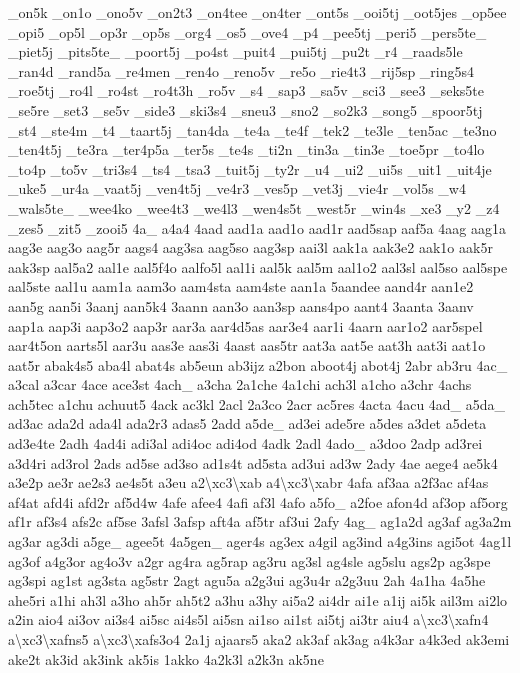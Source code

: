 {\-\_\-on5k \-\_\-on1o \-\_\-ono5v \-\_\-on2t3 \-\_\-on4tee \-\_\-on4ter \-\_\-ont5s \-\_\-ooi5tj \-\_\-oot5jes \-\_\-op5ee \-\_\-opi5 \-\_\-op5l \-\_\-op3r \-\_\-op5s \-\_\-org4 \-\_\-os5 \-\_\-ove4 \-\_\-p4 \-\_\-pee5tj \-\_\-peri5 \-\_\-pers5te\-\_\- \-\_\-piet5j \-\_\-pits5te\-\_\- \-\_\-poort5j \-\_\-po4st \-\_\-puit4 \-\_\-pui5tj \-\_\-pu2t \-\_\-r4 \-\_\-raads5le \-\_\-ran4d \-\_\-rand5a \-\_\-re4men \-\_\-ren4o \-\_\-reno5v \-\_\-re5o \-\_\-rie4t3 \-\_\-rij5sp \-\_\-ring5s4 \-\_\-roe5tj \-\_\-ro4l \-\_\-ro4st \-\_\-ro4t3h \-\_\-ro5v \-\_\-s4 \-\_\-sap3 \-\_\-sa5v \-\_\-sci3 \-\_\-see3 \-\_\-seks5te \-\_\-se5re \-\_\-set3 \-\_\-se5v \-\_\-side3 \-\_\-ski3s4 \-\_\-sneu3 \-\_\-sno2 \-\_\-so2k3 \-\_\-song5 \-\_\-spoor5tj \-\_\-st4 \-\_\-ste4m \-\_\-t4 \-\_\-taart5j \-\_\-tan4da \-\_\-te4a \-\_\-te4f \-\_\-tek2 \-\_\-te3le \-\_\-ten5ac \-\_\-te3no \-\_\-ten4t5j \-\_\-te3ra \-\_\-ter4p5a \-\_\-ter5s \-\_\-te4s \-\_\-ti2n \-\_\-tin3a \-\_\-tin3e \-\_\-toe5pr \-\_\-to4lo \-\_\-to4p \-\_\-to5v \-\_\-tri3s4 \-\_\-ts4 \-\_\-tsa3 \-\_\-tuit5j \-\_\-ty2r \-\_\-u4 \-\_\-ui2 \-\_\-ui5s \-\_\-uit1 \-\_\-uit4je \-\_\-uke5 \-\_\-ur4a \-\_\-vaat5j \-\_\-ven4t5j \-\_\-ve4r3 \-\_\-ves5p \-\_\-vet3j \-\_\-vie4r \-\_\-vol5s \-\_\-w4 \-\_\-wals5te\-\_\- \-\_\-wee4ko \-\_\-wee4t3 \-\_\-we4l3 \-\_\-wen4s5t \-\_\-west5r \-\_\-win4s \-\_\-xe3 \-\_\-y2 \-\_\-z4 \-\_\-zes5 \-\_\-zit5 \-\_\-zooi5 4a\-\_\- a4a4 4aad aad1a aad1o aad1r aad5sap aaf5a 4aag aag1a aag3e aag3o aag5r aags4 aag3sa aag5so aag3sp aai3l aak1a aak3e2 aak1o aak5r aak3sp aal5a2 aal1e aal5f4o aalfo5l aal1i aal5k aal5m aal1o2 aal3sl aal5so aal5spe aal5ste aal1u aam1a aam3o aam4sta aam4ste aan1a 5aandee aand4r aan1e2 aan5g aan5i 3aanj aan5k4 3aann aan3o aan3sp aans4po aant4 3aanta 3aanv aap1a aap3i aap3o2 aap3r aar3a aar4d5as aar3e4 aar1i 4aarn aar1o2 aar5spel aar4t5on aarts5l aar3u aas3e aas3i 4aast aas5tr aat3a aat5e aat3h aat3i aat1o aat5r abak4s5 aba4l abat4s ab5eun ab3ijz a2bon aboot4j abot4j 2abr ab3ru 4ac\-\_\- a3cal a3car 4ace ace3st 4ach\-\_\- a3cha 2a1che 4a1chi ach3l a1cho a3chr 4achs ach5tec a1chu achuut5 4ack ac3kl 2acl 2a3co 2acr ac5res 4acta 4acu 4ad\-\_\- a5da\-\_\- ad3ac ada2d ada4l ada2r3 adas5 2add a5de\-\_\- ad3ei ade5re a5des a3det a5deta ad3e4te 2adh 4ad4i adi3al adi4oc adi4od 4adk 2adl 4ado\-\_\- a3doo 2adp ad3rei a3d4ri ad3rol 2ads ad5se ad3so ad1s4t ad5sta ad3ui ad3w 2ady 4ae aege4 ae5k4 a3e2p ae3r ae2s3 ae4s5t a3eu a2\textbackslash{}xc3\textbackslash{}xab a4\textbackslash{}xc3\textbackslash{}xabr 4afa af3aa a2f3ac af4as af4at afd4i afd2r af5d4w 4afe afee4 4afi af3l 4afo a5fo\-\_\- a2foe afon4d af3op af5org af1r af3s4 afs2c af5se 3afsl 3afsp aft4a af5tr af3ui 2afy 4ag\-\_\- ag1a2d ag3af ag3a2m ag3ar ag3di a5ge\-\_\- agee5t 4a5gen\-\_\- ager4s ag3ex a4gil ag3ind a4g3ins agi5ot 4ag1l ag3of a4g3or ag4o3v a2gr ag4ra ag5rap ag3ru ag3sl ag4sle ag5slu ags2p ag3spe ag3spi ag1st ag3sta ag5str 2agt agu5a a2g3ui ag3u4r a2g3uu 2ah 4a1ha 4a5he ahe5ri a1hi ah3l a3ho ah5r ah5t2 a3hu a3hy ai5a2 ai4dr ai1e a1ij ai5k ail3m ai2lo a2in aio4 ai3ov ai3s4 ai5sc ai4s5l ai5sn ai1so ai1st ai5tj ai3tr aiu4 a\textbackslash{}xc3\textbackslash{}xafn4 a\textbackslash{}xc3\textbackslash{}xafns5 a\textbackslash{}xc3\textbackslash{}xafs3o4 2a1j ajaars5 aka2 ak3af ak3ag a4k3ar a4k3ed ak3emi ake2t ak3id ak3ink ak5is 1akko 4a2k3l a2k3n ak5ne }
